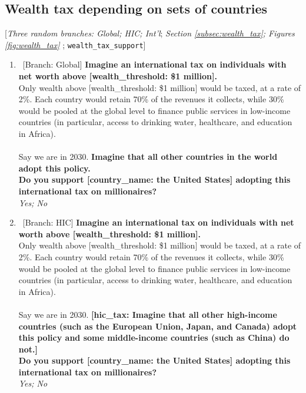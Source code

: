  \subsection*{Wealth tax depending on sets of countries} 
 [\textit{Three random branches: Global; HIC; Int'l}; \textit{Section \ref{subsec:wealth_tax}; Figures \ref{fig:wealth_tax}%
 }; 
 \verb|wealth_tax_support|] 
 \begin{enumerate}[resume] %
\item ~[Branch: Global] \label{q:global_tax_support} \textbf{Imagine an international tax on individuals with net worth above [wealth\_threshold: \$1 million].~}\\Only wealth above [wealth\_threshold: \$1 million] would be taxed, at a rate of 2\%. Each country would retain 70\% of the revenues it collects, while 30\% would be pooled at the global level to finance public services in low-income countries (in particular, access to drinking water, healthcare, and education in Africa). \\\\Say we are in 2030. \textbf{Imagine that all other countries in the world adopt this policy. \\Do you support [country\_name: the United States] adopting this international tax on millionaires?}
  \\ \textit{Yes; No}

\item ~[Branch: HIC] \label{q:hic_tax_support} \textbf{Imagine an international tax on individuals with net worth above [wealth\_threshold: \$1 million].~}\\Only wealth above [wealth\_threshold: \$1 million] would be taxed, at a rate of 2\%. Each country would retain 70\% of the revenues it collects, while 30\% would be pooled at the global level to finance public services in low-income countries (in particular, access to drinking water, healthcare, and education in Africa). \\\\Say we are in 2030. \textbf{[hic\_tax: Imagine that all other high-income countries (such as the European Union, Japan, and Canada) adopt this policy and some middle-income countries (such as China) do not.]}\textbf{~\\Do you support [country\_name: the United States] adopting this international tax on millionaires?}
  \\ \textit{Yes; No}


\end{enumerate}
